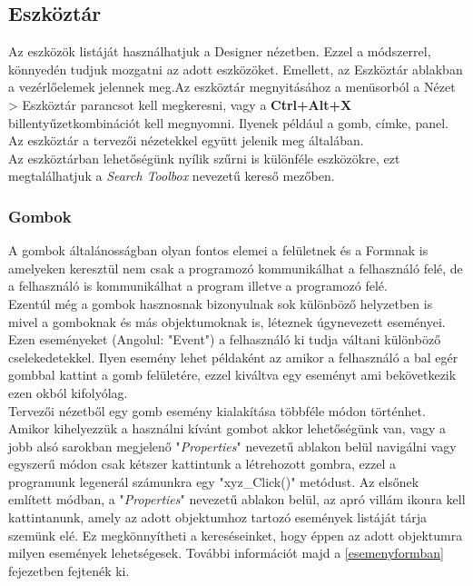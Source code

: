 \documentclass[tocnopagenum]{thesis-ekf}
\theoremstyle{definition}
\theoremstyle{remark}
\begin{document}
	\subsection{Eszköztár}
	\label{EszkozLista}
	Az eszközök listáját használhatjuk a Designer nézetben. Ezzel a módszerrel, könnyedén tudjuk mozgatni az adott eszközöket. Emellett, az Eszköztár ablakban a vezérlőelemek jelennek meg.Az eszköztár megnyitásához a menüsorból a Nézet > Eszköztár parancsot kell megkeresni, vagy a \textbf{Ctrl+Alt+X} billentyűzetkombinációt kell megnyomni. Ilyenek például a gomb, címke, panel. Az eszköztár a tervezői nézetekkel együtt jelenik meg általában. 
	\\
	Az eszköztárban lehetőségünk nyílik szűrni is különféle eszközökre, ezt megtalálhatjuk a \textit{Search Toolbox} nevezetű kereső mezőben.
	\subsubsection{Gombok}
	\label{Gombok}
	A gombok általánosságban olyan fontos elemei a felületnek és a Formnak is amelyeken keresztül nem csak a programozó kommunikálhat a felhasználó felé, de a felhasználó is kommunikálhat a program illetve a programozó felé. 
	\\
	Ezentúl még a gombok hasznosnak bizonyulnak sok különböző helyzetben is mivel a gomboknak és más objektumoknak is, léteznek úgynevezett eseményei. Ezen eseményeket (Angolul: "Event") a felhasználó ki tudja váltani különböző cselekedetekkel. Ilyen esemény lehet példaként az amikor a felhasználó a bal egér gombbal kattint a gomb felületére, ezzel kiváltva egy eseményt ami bekövetkezik ezen okból kifolyólag.
	\\
	Tervezői nézetből egy gomb esemény kialakítása többféle módon történhet. Amikor kihelyezzük a használni kívánt gombot akkor lehetőségünk van, vagy a jobb alsó sarokban megjelenő "\textit{Properties}" nevezetű ablakon belül navigálni vagy egyszerű módon csak kétszer kattintunk a létrehozott gombra, ezzel a programunk legenerál számunkra egy "xyz\_Click()" metódust.
	Az elsőnek említett módban, a "\textit{Properties}" nevezetű ablakon belül, az apró villám ikonra kell kattintanunk, amely az adott objektumhoz tartozó események listáját tárja szemünk elé. Ez megkönnyítheti a kereséseinket, hogy éppen az adott objektumra milyen események lehetségesek. További információt majd a \ref{esemenyformban} fejezetben fejtenék ki.
\end{document}

